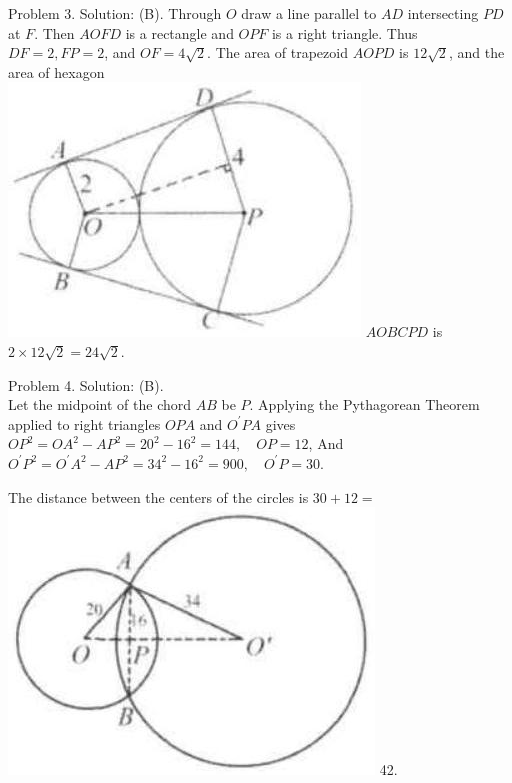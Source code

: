 \documentclass[10pt]{article}
\begin{document}
Problem 3. Solution: (B).
Through \(O\) draw a line parallel to \(A D\) intersecting \(P D\) at \(F\). Then \(A O F D\) is a rectangle and \(O P F\) is a right triangle. Thus \(D F=2, F P=2\), and \(O F=4 \sqrt{2}\). The area of trapezoid \(A O P D\) is \(12 \sqrt{2}\), and the area of hexagon\\
\includegraphics[max width=\textwidth]{2025_04_17_97bc1f7e44d93c271a88g-187} \(A O B C P D\) is \(2 \times 12 \sqrt{2}=24 \sqrt{2}\).


Problem 4. Solution: (B).\\
Let the midpoint of the chord \(A B\) be \(P\). Applying the Pythagorean Theorem applied to right triangles \(O P A\) and \(O^{\prime} P A\) gives\\
\(O P^{2}=O A^{2}-A P^{2}=20^{2}-16^{2}=144, \quad O P=12\), And \(O^{\prime} P^{2}=O^{\prime} A^{2}-A P^{2}=34^{2}-16^{2}=900, \quad O^{\prime} P=30\).

The distance between the centers of the circles is \(30+12=\)\\
\includegraphics[max width=\textwidth]{2025_04_17_97bc1f7e44d93c271a88g-188(1)} 42.
\end{document}
